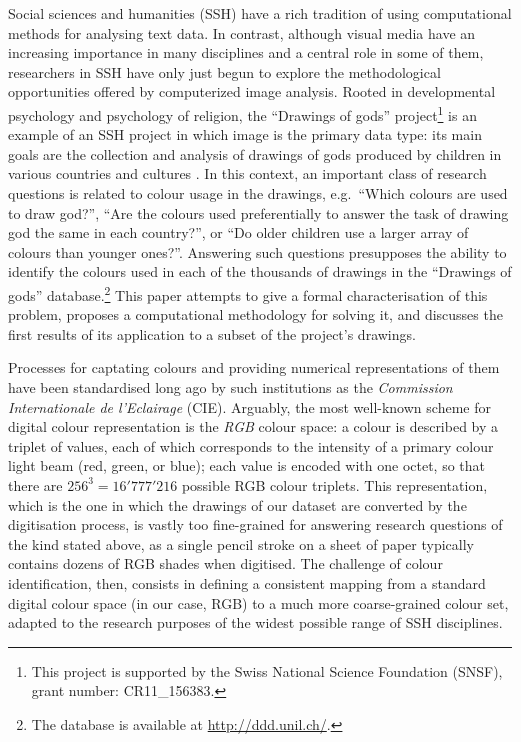 \documentclass[11pt,a4paper]{article}
\begin{document}
Social sciences and humanities (SSH) have a rich tradition of using computational methods for analysing text data. In contrast, although visual media have an increasing importance in many disciplines and a central role in some of them, researchers in SSH have only just begun to explore the methodological opportunities offered by computerized image analysis. Rooted in developmental psychology and psychology of religion, the ``Drawings of gods'' project\footnote{This project is supported by the Swiss National Science Foundation (SNSF), grant number: CR11\_156383.} is an example of an SSH project in which image is the primary data type: its main goals are the collection and analysis of drawings of gods produced by children in various countries and cultures \cite[see e.g.][]{BrandtKagataSpittelerGillieronPaleologue2009,Dandarova2013,DandarovaRobertDessartSerbaevaEtAl2016}. In this context, an important class of research questions is related to colour usage in the drawings, e.g.~``Which colours are used to draw god?'', ``Are the colours used preferentially to answer the task of drawing god the same in each country?'', or ``Do older children use a larger array of colours than younger ones?''. Answering such questions presupposes the ability to identify the colours used in each of the thousands of drawings in the ``Drawings of gods'' database.\footnote{The database is available at \url{http://ddd.unil.ch/}.} This paper attempts to give a formal characterisation of this problem, proposes a computational methodology for solving it, and discusses the first results of its application to a subset of the project's drawings.


Processes for captating colours and providing numerical representations of them have been standardised long ago by such institutions as the  \textit{Commission Internationale de l'Eclairage} (CIE). Arguably, the most well-known scheme for digital colour representation is the {\em RGB} colour space: a colour is described by a triplet of values, each of which corresponds to the intensity of a primary colour light beam (red, green, or blue); each value is encoded with one octet, so that there are $256^3 = 16'777'216$ possible RGB colour triplets. This representation, which is the one in which the drawings of our dataset are converted by the digitisation process, is vastly too fine-grained for answering research questions of the kind stated above, as a single pencil stroke on a sheet of paper typically contains dozens of RGB shades when digitised. The challenge of colour identification, then, consists in defining a consistent mapping from a standard digital colour space (in our case, RGB) to a much more coarse-grained colour set, adapted to the research purposes of the widest possible range of SSH disciplines.
\end{document}
